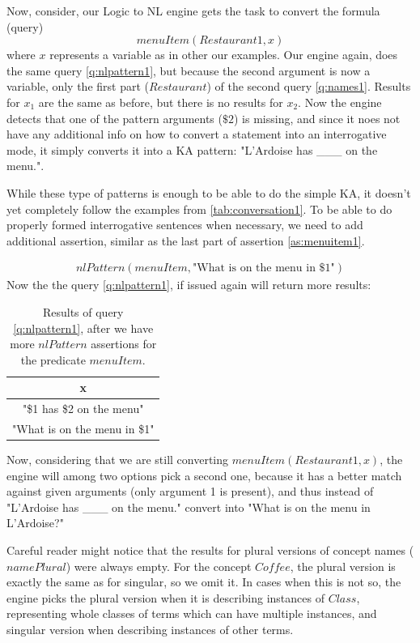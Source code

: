 Now, consider, our Logic to NL engine gets the task to convert the formula
(query)
\begin{equation}
menuItem(Restaurant1,x)
\end{equation}
where $x$ represents a variable as in other our 
examples. Our engine again, does the same query \ref{q:nlpattern1}, but because
the second argument is now a variable, only the first part ($Restaurant$) of 
the second query \ref{q:names1}. Results for $x_1$ are the same as before,
but there is no results for $x_2$. Now the engine detects that one of the 
pattern arguments ($\$2$) is missing, and since it noes not have any additional
info on how to convert a statement into an interrogative mode, it simply
converts it into a KA pattern: "L'Ardoise has \_\_\_ on the menu.".

While these type of patterns is enough to be able to do the simple KA, it
doesn't yet completely follow the examples from \autoref{tab:conversation1}. To
be able to do properly formed interrogative sentences when necessary, we need
to add additional assertion, similar as the last part of assertion 
\ref{as:menuitem1}.

\begin{equation}\label{as:menuitem2}
\begin{gathered}
	nlPattern(menuItem, \text{"What is on the menu in \$1"})
\end{gathered}
\end{equation}
Now the the query \ref{q:nlpattern1}, if issued again will return more
results:
\begin{table}[H]
\centering
\caption{Results of query \ref{q:nlpattern1}, after we have more $nlPattern$ 
assertions for the predicate $menuItem$.}
\label{tab:results3}
\begin{tabular}{|c|}
	\hline
	\textbf{x} \\
    \hline
    "\$1 has \$2 on the menu" \\
    \hline
	"What is on the menu in \$1" \\
	\hline
\end{tabular}
\end{table}
Now, considering that we are still converting $menuItem(Restaurant1,x)$, the
engine will among two options pick a second one, because it has a better match
against given arguments (only argument 1 is present), and thus instead of
"L'Ardoise has \_\_\_ on the menu." convert into 
"What is on the menu in L'Ardoise?"

Careful reader might notice that the results for plural versions of concept 
names ($namePlural$) were always empty. For the concept $Coffee$, the plural
version is exactly the same as for singular, so we omit it. In cases when
this is not so, the engine picks the plural version when it is describing
instances of $Class$, representing whole classes of terms which can have 
multiple instances, and singular version when describing instances of
other terms.

